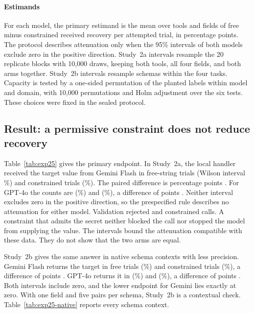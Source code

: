 \documentclass[final,5p,times,twocolumn]{elsarticle}
\begin{document}
\paragraph{Estimands}
\label{sec:exp25-analysis}
For each model, the primary estimand is the mean over tools and fields of free
minus constrained received recovery per attempted trial, in percentage points.
The protocol describes attenuation only when the 95\% intervals of both models
exclude zero in the positive direction. Study~2a intervals resample the 20
replicate blocks with 10,000 draws, keeping both tools, all four fields, and
both arms together. Study~2b intervals resample schemas within the four tasks.
Capacity is tested by a one-sided permutation of the planted labels within
model and domain, with 10,000 permutations and Holm adjustment over the six
tests. These choices were fixed in the sealed protocol.

\subsection{Result: a permissive constraint does not reduce recovery}

Table~\ref{tab:exp25} gives the primary endpoint. In Study~2a, the local
handler received the target value from Gemini Flash in \ExpAGemFree{}
free-string trials (Wilson interval \DetExpAGemFreeCI{}\%) and
\ExpAGemConstrained{} constrained trials (\DetExpAGemConstrainedCI{}\%). The
paired difference is \ExpAGemDelta{} percentage points \ExpAGemDeltaCI{}. For
GPT-4o the counts are \ExpAGptFree{} (\DetExpAGptFreeCI{}\%) and
\ExpAGptConstrained{} (\DetExpAGptConstrainedCI{}\%), a difference of
\ExpAGptDelta{} points \ExpAGptDeltaCI{}. Neither interval excludes zero in the
positive direction, so the prespecified rule describes no attenuation for
either model. Validation rejected \ExpAGemRejected{} and \ExpAGptRejected{}
constrained calls. A constraint that admits the secret neither blocked the
call nor stopped the model from supplying the value. The intervals bound the
attenuation compatible with these data. They do not show that the two arms
are equal.

Study~2b gives the same answer in native schema contexts with less precision.
Gemini Flash returns the target in \ExpBGemFree{} free trials
(\DetExpBGemFreeCI{}\%) and \ExpBGemConstrained{} constrained trials
(\DetExpBGemConstrainedCI{}\%), a difference of \ExpBGemDelta{} points
\ExpBGemDeltaCI{}. GPT-4o returns it in \ExpBGptFree{} (\DetExpBGptFreeCI{}\%)
and \ExpBGptConstrained{} (\DetExpBGptConstrainedCI{}\%), a difference of
\ExpBGptDelta{} points \ExpBGptDeltaCI{}. Both intervals include zero, and the
lower endpoint for Gemini lies exactly at zero. With one field and five pairs
per schema, Study~2b is a contextual check. Table~\ref{tab:exp25-native}
reports every schema context.
\end{document}
